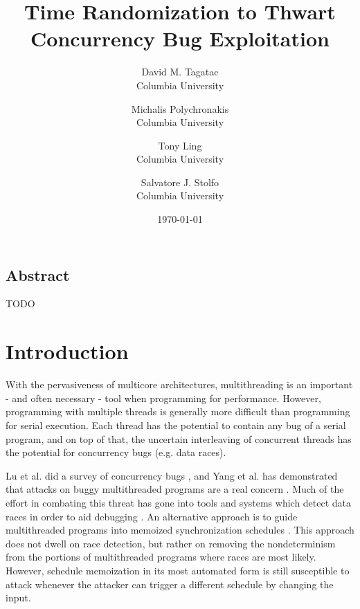 \documentclass[letterpaper,twocolumn,10pt]{article}
\begin{document}
\date{\today}

\title{\Large \bf Time Randomization to Thwart Concurrency Bug Exploitation}

\author{
{\rm David M. Tagatac}\\
Columbia University
\and
{\rm Michalis Polychronakis}\\
Columbia University
\and
{\rm Tony Ling}\\
Columbia University
\and
{\rm Salvatore J. Stolfo}\\
Columbia University
} %

\maketitle



\subsection*{Abstract}
TODO

\section{Introduction}
With the pervasiveness of multicore architectures, multithreading is an important - and often necessary - tool when programming for performance.  However, programming with multiple threads is generally more difficult than programming for serial execution.  Each thread has the potential to contain any bug of a serial program, and on top of that, the uncertain interleaving of concurrent threads has the potential for concurrency bugs (e.g. data races).

Lu et al. did a survey of concurrency bugs \cite{Lu2008}, and Yang et al. has demonstrated that attacks on buggy multithreaded programs are a real concern \cite{Yang2011}.  Much of the effort in combating this threat has gone into tools and systems which detect data races in order to aid debugging \cite{Savage1997, Flanagan2004, Laadan2011, Pratikakis2011, Kasikci2013}.  An alternative approach is to guide multithreaded programs into memoized synchronization schedules \cite{Cui2011}.  This approach does not dwell on race detection, but rather on removing the nondeterminism from the portions of multithreaded programs where races are most likely.  However, schedule memoization in its most automated form is still susceptible to attack whenever the attacker can trigger a different schedule by changing the input.
\end{document}

